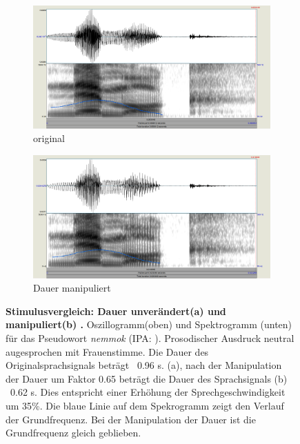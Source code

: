 \documentclass[11pt,a4paper,headsepline,twoside,toc=bibliography]{scrreprt}
\begin{document}
\begin{figure}
	\centering
	\begin{subfigure}{1\textwidth}
		\centering
		\includegraphics[width=1\linewidth]{pics/nemmok.png}
		\caption{original}
		\label{fig:nemmok_original}
	\end{subfigure}
	\par\bigskip  
	\begin{subfigure}{1\textwidth}
		\centering
		\includegraphics[width=1\linewidth]{pics/nemmok_tempo.png}
		\caption{Dauer manipuliert}
		\label{fig:nemmok_tempo}
	\end{subfigure}
	\caption{\textbf{Stimulusvergleich: Dauer unverändert(a) und manipuliert(b) .} Oszillogramm(oben) und Spektrogramm (unten) für das Pseudowort \emph{nemmok} (IPA: ). Prosodischer Ausdruck neutral augesprochen mit Frauenstimme. Die Dauer des Originalsprachsignals beträgt ~0.96 s. (a), nach der Manipulation der Dauer um Faktor 0.65 beträgt die Dauer des Sprachsignals (b) ~0.62 s. Dies entspricht einer Erhöhung der Sprechgeschwindigkeit um 35\%. Die blaue Linie auf dem Spekrogramm zeigt den Verlauf der Grundfrequenz. Bei der Manipulation der Dauer ist die Grundfrequenz gleich geblieben.}
	\label{fig:tempo_manipulation}
\end{figure}
\end{document}
